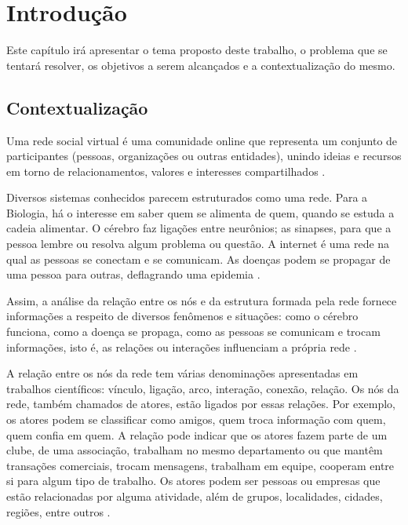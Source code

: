 \chapter[Introdução]{Introdução}

Este capítulo irá apresentar o tema proposto deste trabalho, o problema que se tentará resolver, os objetivos a serem alcançados e a contextualização do mesmo.

\section{Contextualização}

Uma rede social virtual é uma comunidade online que representa um conjunto de participantes (pessoas, organizações ou outras entidades), unindo ideias e recursos em torno de relacionamentos, valores e interesses compartilhados \cite{Marteleto:2001}.

Diversos sistemas conhecidos parecem estruturados como uma rede. Para a Biologia, há o interesse em saber quem se alimenta de quem, quando se estuda a cadeia alimentar. O cérebro faz ligações entre neurônios; as sinapses, para que a pessoa lembre ou resolva algum problema ou questão. A internet é uma rede na qual as pessoas se conectam e se comunicam. As doenças podem se propagar de uma pessoa para outras, deflagrando uma epidemia \cite{Goular:2014}.

Assim, a análise da relação entre os nós e da estrutura formada pela rede fornece informações a respeito de diversos fenômenos e situações: como o cérebro funciona, como a doença se propaga, como as pessoas se comunicam e trocam informações, isto é, as relações ou interações influenciam a própria rede \cite{Goular:2014}.

A relação entre os nós da rede tem várias denominações apresentadas em trabalhos científicos: vínculo, ligação, arco, interação, conexão, relação. Os nós da rede, também chamados de atores, estão ligados por essas relações. Por exemplo, os atores podem se classificar como amigos, quem troca informação com quem, quem confia em quem. A relação pode indicar que os atores fazem parte de um clube, de uma associação, trabalham no mesmo departamento ou que mantêm transações comerciais, trocam mensagens, trabalham em equipe, cooperam entre si para algum tipo de trabalho. Os atores podem ser pessoas ou empresas que estão relacionadas por alguma atividade, além de grupos, localidades, cidades, regiões, entre outros \cite{Hanneman:Riddle:2005}.


